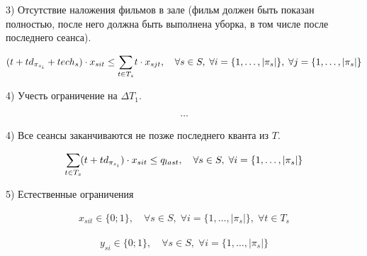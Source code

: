 \documentclass[14pt,fleqn]{extarticle}
\begin{document}
	3) Отсутствие наложения фильмов в зале (фильм должен быть показан полностью, после него должна быть выполнена уборка, в том числе после последнего сеанса).
	
	\begin{ceqn}
		\begin{align*}
			(t + td_{\pi_{s_i}} + tech_s) \cdot x_{sit} \leq \smashoperator[r]{\sum_{t \in T_s}} t \cdot x_{sjt}, \quad \forall s \in S, \; \forall i = \{1, \dots, |\pi_s|\}, \; \forall j = \{1, \dots, |\pi_s|\}
		\end{align*}
	\end{ceqn}

	4) Учесть ограничение на $\Delta T_1$.
	
	\begin{ceqn}
		\begin{align*}
			\dots
		\end{align*}
	\end{ceqn}

	4) Все сеансы заканчиваются не позже последнего кванта из $T$.

	\begin{ceqn}
		\begin{align*}
			\smashoperator[r]{\sum_{t \in T_s}} (t + td_{\pi_{s_i}}) \cdot x_{sit} \leq q_{last}, \quad \forall s \in S, \; \forall i = \{1, \dots, |\pi_s|\}
		\end{align*}
	\end{ceqn}

	5) Естественные ограничения

	\begin{ceqn}
		\begin{align*}
			x_{sit} \in \{0; 1\}, \quad \forall s \in S, \; \forall i = \{1, \dots, |\pi_s|\}, \; \forall t \in T_s
		\end{align*}
	\end{ceqn}

	\begin{ceqn}
		\begin{align*}
			y_{si} \in \{0; 1\}, \quad \forall s \in S, \; \forall i = \{1, \dots, |\pi_s|\}
		\end{align*}
	\end{ceqn}
	
\end{document}
